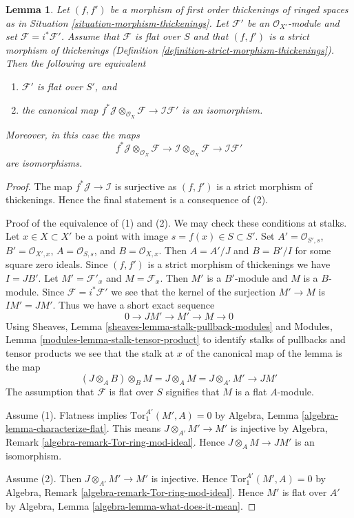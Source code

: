 \documentclass{stacks-project}
\theoremstyle{plain}
\newtheorem{lemma}[subsection]{Lemma}
\theoremstyle{definition}
\theoremstyle{remark}
\numberwithin{equation}{subsection}
\begin{document}
\begin{lemma}
\label{lemma-deform-module}
Let $(f, f')$ be a morphism of first order thickenings of ringed spaces
as in Situation \ref{situation-morphism-thickenings}.
Let $\mathcal{F}'$ be an $\mathcal{O}_{X'}$-module
and set $\mathcal{F} = i^*\mathcal{F}'$.
Assume that $\mathcal{F}$ is flat over $S$
and that $(f, f')$ is a strict morphism of thickenings
(Definition \ref{definition-strict-morphism-thickenings}).
Then the following are equivalent
\begin{enumerate}
\item $\mathcal{F}'$ is flat over $S'$, and
\item the canonical map
$f^*\mathcal{J} \otimes_{\mathcal{O}_X} \mathcal{F} \to
\mathcal{I}\mathcal{F}'$
is an isomorphism.
\end{enumerate}
Moreover, in this case the maps
$$
f^*\mathcal{J} \otimes_{\mathcal{O}_X} \mathcal{F} \to
\mathcal{I} \otimes_{\mathcal{O}_X} \mathcal{F} \to
\mathcal{I}\mathcal{F}'
$$
are isomorphisms.
\end{lemma}

\begin{proof}
The map $f^*\mathcal{J} \to \mathcal{I}$ is surjective
as $(f, f')$ is a strict morphism of thickenings.
Hence the final statement is a consequence of (2).

\medskip\noindent
Proof of the equivalence of (1) and (2). We may check these conditions
at stalks. Let $x \in X \subset X'$
be a point with image $s = f(x) \in S \subset S'$.
Set $A' = \mathcal{O}_{S', s}$, $B' = \mathcal{O}_{X', x}$,
$A = \mathcal{O}_{S, s}$, and $B = \mathcal{O}_{X, x}$.
Then $A = A'/J$ and $B = B'/I$ for some square zero ideals.
Since $(f, f')$ is a strict morphism of thickenings we have $I = JB'$.
Let $M' = \mathcal{F}'_x$ and $M = \mathcal{F}_x$.
Then $M'$ is a $B'$-module and $M$ is a $B$-module.
Since $\mathcal{F} = i^*\mathcal{F}'$ we see that the kernel of the
surjection $M' \to M$ is $IM' = JM'$. Thus we have a short exact
sequence
$$
0 \to JM' \to M' \to M \to 0
$$
Using
Sheaves, Lemma \ref{sheaves-lemma-stalk-pullback-modules}
and
Modules, Lemma \ref{modules-lemma-stalk-tensor-product}
to identify stalks of pullbacks and tensor products we see
that the stalk at $x$ of the canonical map of the lemma is the map
$$
(J \otimes_A B) \otimes_B M = J \otimes_A M = J \otimes_{A'} M'
\longrightarrow JM'
$$
The assumption that $\mathcal{F}$ is flat over $S$ signifies that
$M$ is a flat $A$-module.

\medskip\noindent
Assume (1). Flatness implies $\text{Tor}_1^{A'}(M', A) = 0$ by
Algebra, Lemma \ref{algebra-lemma-characterize-flat}.
This means $J \otimes_{A'} M' \to M'$ is injective by
Algebra, Remark \ref{algebra-remark-Tor-ring-mod-ideal}.
Hence $J \otimes_A M \to JM'$ is an isomorphism.

\medskip\noindent
Assume (2). Then $J \otimes_{A'} M' \to M'$ is injective. Hence
$\text{Tor}_1^{A'}(M', A) = 0$ by
Algebra, Remark \ref{algebra-remark-Tor-ring-mod-ideal}.
Hence $M'$ is flat over $A'$ by
Algebra, Lemma \ref{algebra-lemma-what-does-it-mean}.
\end{proof}
\end{document}
